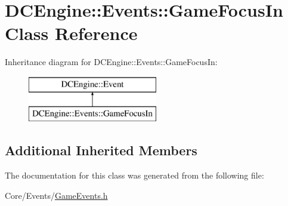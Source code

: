 \hypertarget{classDCEngine_1_1Events_1_1GameFocusIn}{\section{D\-C\-Engine\-:\-:Events\-:\-:Game\-Focus\-In Class Reference}
\label{classDCEngine_1_1Events_1_1GameFocusIn}
}
Inheritance diagram for D\-C\-Engine\-:\-:Events\-:\-:Game\-Focus\-In\-:\begin{figure}[H]
\begin{center}
\leavevmode
\includegraphics[height=2.000000cm]{classDCEngine_1_1Events_1_1GameFocusIn}
\end{center}
\end{figure}
\subsection*{Additional Inherited Members}


The documentation for this class was generated from the following file\-:\begin{DoxyCompactItemize}
\item 
Core/\-Events/\hyperlink{GameEvents_8h}{Game\-Events.\-h}\end{DoxyCompactItemize}
